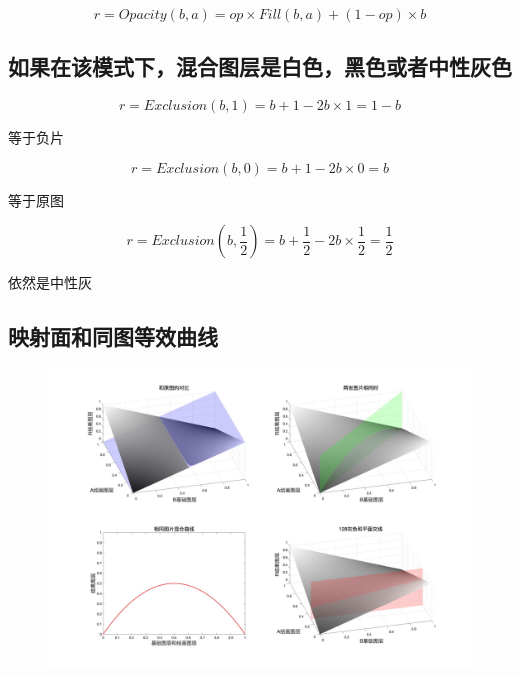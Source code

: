 \begin{equation}r=Opacity(b,a)=op\times Fill(b,a)+(1-op)\times b\end{equation}

\subsection{ 如果在该模式下，混合图层是白色，黑色或者中性灰色}


\begin{equation}r=Exclusion(b,1)=b+1-2b\times 1=1-b\end{equation}

等于负片


\begin{equation}r=Exclusion(b,0)=b+1-2b\times 0=b\end{equation}

等于原图


\begin{equation}r=Exclusion(b,\dfrac{1}{2})=b+\dfrac{1}{2}-2b\times \dfrac{1}{2}=\dfrac{1}{2}\end{equation}

依然是中性灰
\newpage
\subsection{ 映射面和同图等效曲线}
\begin{figure}[h!]
	\centering
	\includegraphics[width=\linewidth]{figure/排除}
	\caption{}
	\label{fig:}
\end{figure}

